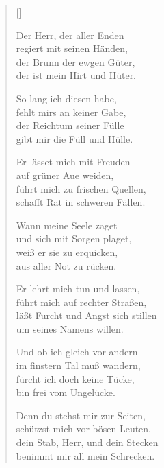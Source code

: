 \begin{multicols}{2}
\settowidth{\versewidth}{Der Herr, der aller Enden}
\begin{verse}[\versewidth]

 Der Herr, der aller Enden\\
regiert mit seinen Händen,\\
der Brunn der ewgen Güter,\\
der ist mein Hirt und Hüter.

 So lang ich diesen habe,\\
fehlt mirs an keiner Gabe,\\
der Reichtum seiner Fülle\\
gibt mir die Füll und Hülle.

 Er lässet mich mit Freuden\\
auf grüner Aue weiden,\\
führt mich zu frischen Quellen,\\
schafft Rat in schweren Fällen.

 Wann meine Seele zaget\\
und sich mit Sorgen plaget,\\
weiß er sie zu erquicken,\\
aus aller Not zu rücken.

 Er lehrt mich tun und lassen,\\
führt mich auf rechter Straßen,\\
läßt Furcht und Angst sich stillen\\
um seines Namens willen.

 Und ob ich gleich vor andern\\
im finstern Tal muß wandern,\\
fürcht ich doch keine Tücke,\\
bin frei vom Ungelücke.

 Denn du stehst mir zur Seiten,\\
schützst mich vor bösen Leuten,\\
dein Stab, Herr, und dein Stecken\\
benimmt mir all mein Schrecken.


\end{verse}
\end{multicols}
